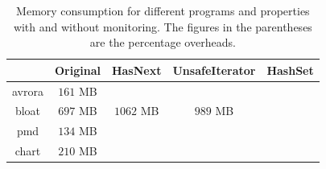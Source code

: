 \begin{table}[t]
\centering
\small
\begin{tabular}{|c|c|c|c|c|}
\hline
 & Original & HasNext & UnsafeIterator & HashSet\\
 \hline
avrora  & $161$ MB & & &\\\hline
bloat & $697$ MB & $1062$ MB & $989$ MB  &\\\hline
pmd  & $134$ MB &  & &\\\hline
chart & $210$ MB & & &\\\hline
\end{tabular}
\caption{Memory consumption for different programs and properties with and 
without monitoring. The figures in the parentheses are the percentage 
overheads. %
}
\end{table}
\label{table:consumedmemory}

